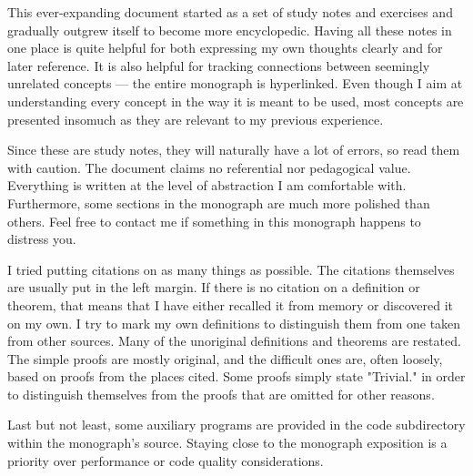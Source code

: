 
This ever-expanding document started as a set of study notes and exercises and gradually outgrew itself to become more encyclopedic. Having all these notes in one place is quite helpful for both expressing my own thoughts clearly and for later reference. It is also helpful for tracking connections between seemingly unrelated concepts --- the entire monograph is hyperlinked. Even though I aim at understanding every concept in the way it is meant to be used, most concepts are presented insomuch as they are relevant to my previous experience.

Since these are study notes, they will naturally have a lot of errors, so read them with caution. The document claims no referential nor pedagogical value. Everything is written at the level of abstraction I am comfortable with. Furthermore, some sections in the monograph are much more polished than others. Feel free to contact me if something in this monograph happens to distress you.

I tried putting citations on as many things as possible. The citations themselves are usually put in the left margin. If there is no citation on a definition or theorem, that means that I have either recalled it from memory or discovered it on my own. I try to mark my own definitions to distinguish them from one taken from other sources. Many of the unoriginal definitions and theorems are restated. The simple proofs are mostly original, and the difficult ones are, often loosely, based on proofs from the places cited. Some proofs simply state "Trivial." in order to distinguish themselves from the proofs that are omitted for other reasons.

Last but not least, some auxiliary programs are provided in the code subdirectory within the monograph's source. Staying close to the monograph exposition is a priority over performance or code quality considerations.
